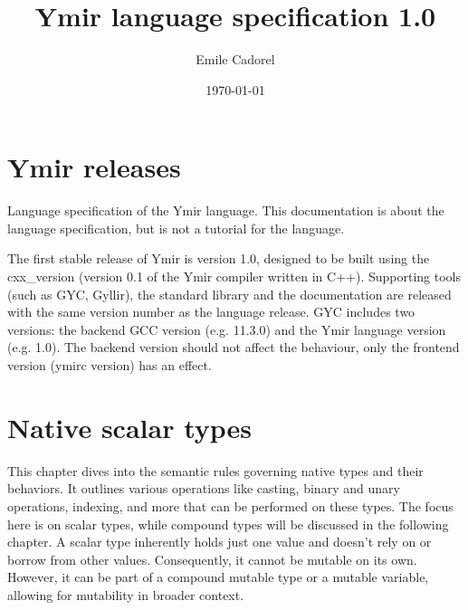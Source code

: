 \documentclass[twoside,a4paper,11pt]{book}
\author{Emile Cadorel}
\date{\today}
\title{Ymir language specification 1.0}
\begin{document}
\setlength{\aweboxleftmargin}{0.05\linewidth}
\setlength{\aweboxcontentwidth}{0.93\linewidth}


\maketitle
\dominitoc
\dominilof
\dominilot

\chapter*{Ymir releases}

Language specification of the Ymir language. This documentation is about the language specification, but is not a tutorial for the language.


The first stable release of Ymir is version 1.0, designed to be built using the
cxx\_version (version 0.1 of the Ymir compiler written in C++). Supporting tools
(such as GYC, Gyllir), the standard library and the documentation are released
with the same version number as the language release. GYC includes two versions:
the backend GCC version (e.g. 11.3.0) and the Ymir language version (e.g. 1.0).
The backend version should not affect the behaviour, only the frontend version
(ymirc version) has an effect.

\begin{multicols*}{2}
  \tableofcontents
\end{multicols*}

\chapter{Native scalar types}

This chapter dives into the semantic rules governing native types and their
behaviors. It outlines various operations like casting, binary and unary
operations, indexing, and more that can be performed on these types. The focus
here is on scalar types, while compound types will be discussed in the following
chapter. A scalar type inherently holds just one value and doesn't rely on or
borrow from other values. Consequently, it cannot be mutable on its own.
However, it can be part of a compound mutable type or a mutable variable,
allowing for mutability in broader context.

\begin{multicols*}{2}
  \minitoc%
  
\end{multicols*}
\end{document}

